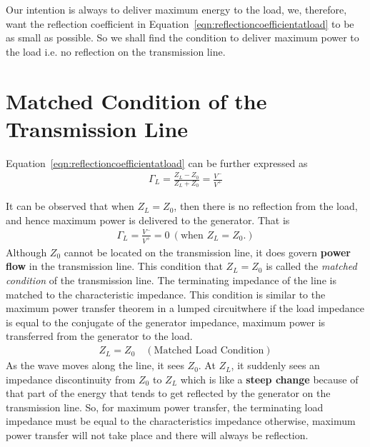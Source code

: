 Our intention is always to deliver maximum energy to the load, we, therefore, want the reflection coefficient in Equation~\eqref{eqn:reflectioncoefficientatload} to be as small as possible. So we shall find the condition to deliver maximum power to the load i.e. no reflection on the transmission line.

\section{Matched Condition of the Transmission Line}\label{lec:lec4}
Equation~\eqref{eqn:reflectioncoefficientatload} can be further expressed as
\begin{align*}
\Gamma_L = \frac{Z_L - Z_0}{Z_L + Z_0} = \frac{V^-}{V^+}
\end{align*}

It can be observed that when $Z_L = Z_0$, then there is no reflection from the load, and hence maximum power is delivered to the generator. That is
\begin{align*}
\Gamma_L = \frac{V^-}{V^+} = 0\ (\text{when }Z_L = Z_0.) 
\end{align*}
Although $Z_0$ cannot be located on the transmission line, it does govern\textbf{ power flow} in the transmission line. This condition that $Z_L = Z_0$ is called the \emph{matched condition} of the transmission line. The terminating impedance of the line is matched to the characteristic impedance. This condition is similar to the maximum power transfer theorem in a lumped circuit\textemdash where if the load impedance is equal to the conjugate of the generator impedance, maximum power is transferred from the generator to the load.
\begin{align*}
Z_L = Z_0 \quad (\text{Matched Load Condition})
\end{align*}
As the wave moves along the line, it sees $Z_0$. At $Z_L$, it suddenly sees an impedance discontinuity from $Z_0$ to $Z_L$ which is like a \textbf{steep change} because of that part of the energy that tends to get reflected by the generator on the transmission line. So, for maximum power transfer, the terminating load impedance must be equal to the characteristics impedance otherwise, maximum power transfer will not take place and there will always be reflection.

